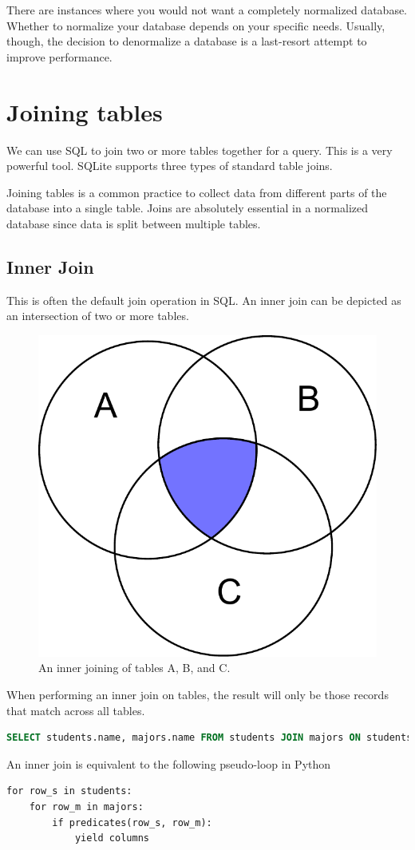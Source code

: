 \begin{info}
There are instances where you would not want a completely normalized database.
Whether to normalize your database depends on your specific needs.
Usually, though, the decision to denormalize a database is a last-resort attempt to improve performance.
\end{info}

\section*{Joining tables}
We can use SQL to join two or more tables together for a query.
This is a very powerful tool.
SQLite supports three types of standard table joins.

Joining tables is a common practice to collect data from different parts of the database into a single table.
Joins are absolutely essential in a normalized database since data is split between multiple tables.

\subsection*{Inner Join}
This is often the default join operation in SQL.
An inner join can be depicted as an intersection of two or more tables.
\begin{figure}
\centering
\includegraphics[width=.5\textwidth]{inner_join.pdf}
\caption{An inner joining of tables A, B, and C.}
\label{fig:inner_join}
\end{figure}
When performing an inner join on tables, the result will only be those records that match across all tables.
\begin{lstlisting}[language=SQL]
SELECT students.name, majors.name FROM students JOIN majors ON students.majorcode=majors.id;
\end{lstlisting}
An inner join is equivalent to the following pseudo-loop in Python
\begin{lstlisting}
for row_s in students:
    for row_m in majors:
        if predicates(row_s, row_m):
            yield columns
\end{lstlisting}

